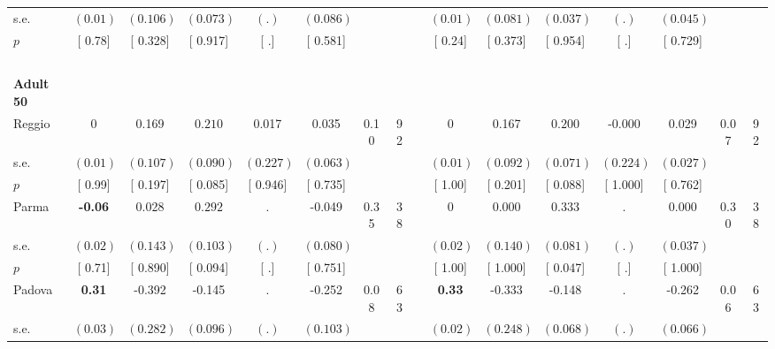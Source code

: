 \begin{longtable}{L{8em} c c c c c c c p{1em} c c c c c c c}
\quad \quad \quad \quad s.e.& $ (     0.01)$ & $ (    0.106)$ & $ (    0.073)$ & $ (        .)$ & $ (    0.086)$ & & & & $ (     0.01)$ & $ (    0.081)$ & $ (    0.037)$ & $ (        .)$ & $ (    0.045)$ & &  \\*
\quad \quad \quad \quad $ p$ & [     0.78] & [    0.328] & [    0.917] & [        .] & [    0.581] & & & & [     0.24] & [    0.373] & [    0.954] & [        .] & [    0.729] & &  \\[1em]
~\\[1em]
\quad \quad \textbf{Adult 50} & & & & & & & & & & & & & & & \\* 
\quad \quad \quad Reggio& 0 &     0.169 & $ \mathbf{    0.210}$ &     0.017 &     0.035 &      0.10 &        92 & & 0 &     0.167 & $ \mathbf{    0.200}$ &    -0.000 &     0.029 &      0.07 &        92  \\*
\quad \quad \quad \quad s.e.& $ (     0.01)$ & $ (    0.107)$ & $ (    0.090)$ & $ (    0.227)$ & $ (    0.063)$ & & & & $ (     0.01)$ & $ (    0.092)$ & $ (    0.071)$ & $ (    0.224)$ & $ (    0.027)$ & &  \\*
\quad \quad \quad \quad $ p$ & [     0.99] & [    0.197] & [    0.085] & [    0.946] & [    0.735] & & & & [     1.00] & [    0.201] & [    0.088] & [    1.000] & [    0.762] & &  \\[1em]
\quad \quad \quad Parma& \textbf{    -0.06} &     0.028 & $ \mathbf{    0.292}$ &         . &    -0.049 &      0.35 &        38 & & 0 &     0.000 & $ \mathbf{    0.333}$ &         . &     0.000 &      0.30 &        38  \\*
\quad \quad \quad \quad s.e.& $ (     0.02)$ & $ (    0.143)$ & $ (    0.103)$ & $ (        .)$ & $ (    0.080)$ & & & & $ (     0.02)$ & $ (    0.140)$ & $ (    0.081)$ & $ (        .)$ & $ (    0.037)$ & &  \\*
\quad \quad \quad \quad $ p$ & [     0.71] & [    0.890] & [    0.094] & [        .] & [    0.751] & & & & [     1.00] & [    1.000] & [    0.047] & [        .] & [    1.000] & &  \\[1em]
\quad \quad \quad Padova& \textbf{     0.31} &    -0.392 &    -0.145 &         . &    -0.252 &      0.08 &        63 & & \textbf{     0.33} &    -0.333 &    -0.148 &         . &    -0.262 &      0.06 &        63  \\*
\quad \quad \quad \quad s.e.& $ (     0.03)$ & $ (    0.282)$ & $ (    0.096)$ & $ (        .)$ & $ (    0.103)$ & & & & $ (     0.02)$ & $ (    0.248)$ & $ (    0.068)$ & $ (        .)$ & $ (    0.066)$ & &  \\*

\end{longtable}
